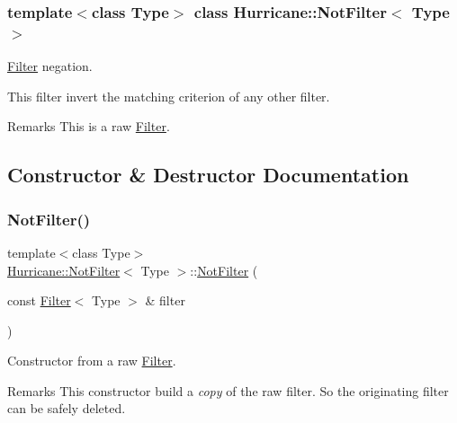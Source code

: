 \subsubsection*{template$<$class Type$>$\newline
class Hurricane\+::\+Not\+Filter$<$ Type $>$}

\mbox{\hyperlink{classHurricane_1_1Filter}{Filter}} negation. 

This filter invert the matching criterion of any other filter.

\begin{DoxyRemark}{Remarks}
This is a raw \mbox{\hyperlink{classHurricane_1_1Filter}{Filter}}. 
\end{DoxyRemark}


\subsection{Constructor \& Destructor Documentation}
\mbox{\label{classHurricane_1_1NotFilter_a8c75f2e192929c1b559f4ca876e47126}} 
\subsubsection{\texorpdfstring{Not\+Filter()}{NotFilter()}\hspace{0.1cm}{\footnotesize\ttfamily [1/2]}}
{\footnotesize\ttfamily template$<$class Type$>$ \\
\mbox{\hyperlink{classHurricane_1_1NotFilter}{Hurricane\+::\+Not\+Filter}}$<$ Type $>$\+::\mbox{\hyperlink{classHurricane_1_1NotFilter}{Not\+Filter}} (\begin{DoxyParamCaption}\item[{const \mbox{\hyperlink{classHurricane_1_1Filter}{Filter}}$<$ Type $>$ \&}]{filter }\end{DoxyParamCaption})\hspace{0.3cm}{\ttfamily [inline]}}

Constructor from a raw \mbox{\hyperlink{classHurricane_1_1Filter}{Filter}}.

\begin{DoxyRemark}{Remarks}
This constructor build a {\itshape copy} of the raw filter. So the originating filter can be safely deleted. 
\end{DoxyRemark}
\mbox{\label{classHurricane_1_1NotFilter_a232102dc584111a704e66b2ac793af86}} 
